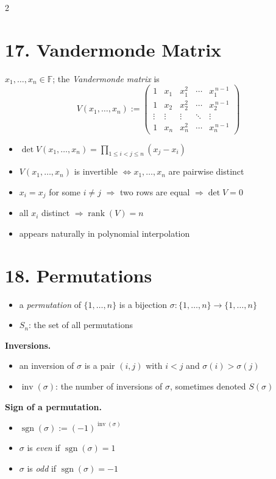 \documentclass[fleqn]{article}
\newcommand{\subhead}[1]{\medskip\noindent\textbf{#1}}
\begin{document}
\begin{multicols}{2}
\section*{17. Vandermonde Matrix}

$x_1,\dots,x_n \in \mathbb{F}$; the \emph{Vandermonde matrix} is
\[
V(x_1,\dots,x_n):=
\begin{pmatrix}
1 & x_1 & x_1^2 & \cdots & x_1^{\,n-1} \\
1 & x_2 & x_2^2 & \cdots & x_2^{\,n-1} \\
\vdots & \vdots & \vdots & \ddots & \vdots \\
1 & x_n & x_n^2 & \cdots & x_n^{\,n-1}
\end{pmatrix}
\]

\begin{itemize}
\item $\displaystyle \det V(x_1,\dots,x_n) = \prod_{1 \le i < j \le n} (x_j - x_i)$
\item $V(x_1,\dots,x_n)$ is invertible $\iff x_1,\dots,x_n$ are pairwise distinct
\item $x_i = x_j$ for some $i \neq j$ $\Rightarrow$ two rows are equal $\Rightarrow \det V = 0$
\item all $x_i$ distinct $\Rightarrow \operatorname{rank}(V)=n$
\item appears naturally in polynomial interpolation
\end{itemize}

\section*{18. Permutations}

\begin{itemize}
\item a \emph{permutation} of $\{1,\dots,n\}$ is a bijection $\sigma:\{1,\dots,n\}\to\{1,\dots,n\}$
\item $S_n$: the set of all permutations
\end{itemize}

\subhead{Inversions.}
\begin{itemize}
\item an inversion of $\sigma$ is a pair $(i,j)$ with $i<j$ and $\sigma(i)>\sigma(j)$
\item $\operatorname{inv}(\sigma)$: the number of inversions of $\sigma$, sometimes denoted $S(\sigma)$
\end{itemize}

\subhead{Sign of a permutation.}
\begin{itemize}
\item $\operatorname{sgn}(\sigma):=(-1)^{\operatorname{inv}(\sigma)}$
\item $\sigma$ is \emph{even} if $\operatorname{sgn}(\sigma)=1$
\item $\sigma$ is \emph{odd} if $\operatorname{sgn}(\sigma)=-1$
\end{itemize}


\end{multicols}
\end{document}
